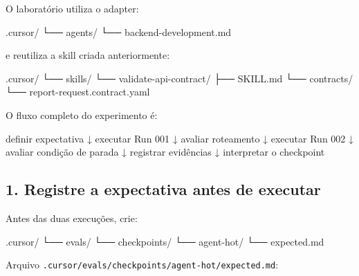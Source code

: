\documentclass[
  10pt,
  a4paper,
  oneside]{book}
\newenvironment{Shaded}{}{}
\newcommand{\NormalTok}[1]{#1}
\renewenvironment{Shaded}{\begin{snugshade}}{\end{snugshade}}%
\begin{document}
O laboratório utiliza o adapter:

\begin{Shaded}
\begin{Highlighting}[]
\NormalTok{.cursor/}
\NormalTok{└── agents/}
\NormalTok{    └── backend{-}development.md}
\end{Highlighting}
\end{Shaded}

e reutiliza a skill criada anteriormente:

\begin{Shaded}
\begin{Highlighting}[]
\NormalTok{.cursor/}
\NormalTok{└── skills/}
\NormalTok{    └── validate{-}api{-}contract/}
\NormalTok{        ├── SKILL.md}
\NormalTok{        └── contracts/}
\NormalTok{            └── report{-}request.contract.yaml}
\end{Highlighting}
\end{Shaded}

O fluxo completo do experimento é:

\begin{Shaded}
\begin{Highlighting}[]
\NormalTok{definir expectativa}
\NormalTok{        ↓}
\NormalTok{executar Run 001}
\NormalTok{        ↓}
\NormalTok{avaliar roteamento}
\NormalTok{        ↓}
\NormalTok{executar Run 002}
\NormalTok{        ↓}
\NormalTok{avaliar condição de parada}
\NormalTok{        ↓}
\NormalTok{registrar evidências}
\NormalTok{        ↓}
\NormalTok{interpretar o checkpoint}
\end{Highlighting}
\end{Shaded}

\hypertarget{registre-a-expectativa-antes-de-executar}{%
\subsection{1. Registre a expectativa antes de
executar}\label{registre-a-expectativa-antes-de-executar}}

Antes das duas execuções, crie:

\begin{Shaded}
\begin{Highlighting}[]
\NormalTok{.cursor/}
\NormalTok{└── evals/}
\NormalTok{    └── checkpoints/}
\NormalTok{        └── agent{-}hot/}
\NormalTok{            └── expected.md}
\end{Highlighting}
\end{Shaded}

Arquivo \texttt{.cursor/evals/checkpoints/agent-hot/expected.md}:
\end{document}
